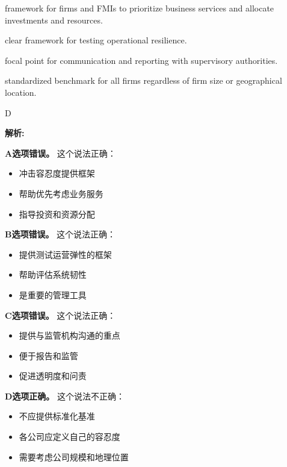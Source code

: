 \documentclass{article}
\newenvironment{explanation}
{\textbf{解析:}\par}
{\par}
\begin{document}
\begin{choices}
    \item framework for firms and FMIs to prioritize business services and allocate investments and resources.
    \item clear framework for testing operational resilience.
    \item focal point for communication and reporting with supervisory authorities.
    \item standardized benchmark for all firms regardless of firm size or geographical location.
\end{choices}

\begin{correctanswer}
    D
\end{correctanswer}

\begin{explanation}
    \textbf{A选项错误。}
    这个说法正确：
    \begin{itemize}
        \item 冲击容忍度提供框架
        \item 帮助优先考虑业务服务
        \item 指导投资和资源分配
    \end{itemize}

    \textbf{B选项错误。}
    这个说法正确：
    \begin{itemize}
        \item 提供测试运营弹性的框架
        \item 帮助评估系统韧性
        \item 是重要的管理工具
    \end{itemize}

    \textbf{C选项错误。}
    这个说法正确：
    \begin{itemize}
        \item 提供与监管机构沟通的重点
        \item 便于报告和监管
        \item 促进透明度和问责
    \end{itemize}

    \textbf{D选项正确。}
    这个说法不正确：
    \begin{itemize}
        \item 不应提供标准化基准
        \item 各公司应定义自己的容忍度
        \item 需要考虑公司规模和地理位置
    \end{itemize}
\end{explanation}
\end{document}
